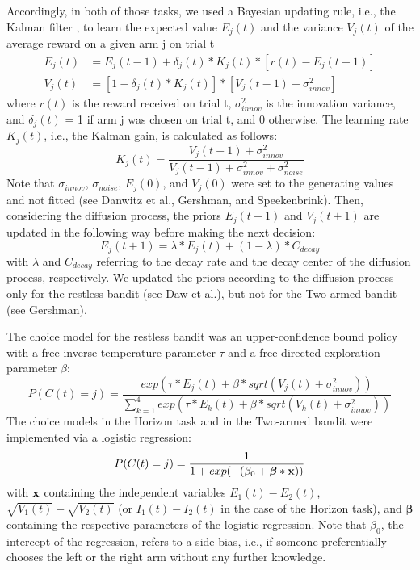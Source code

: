 \documentclass[fleqn,10pt]{wlscirep}
\begin{document}
Accordingly, in both of those tasks, we used a Bayesian updating rule, i.e., the Kalman filter \cite{kalman_new_1960, kalman_new_1961}, to learn the expected value $E_j(t)$ and the variance $V_j(t)$ of the average reward on a given arm j on trial t
\begin{align}
E_j(t)  &=  E_j(t-1)  + \delta_j(t) * K_j(t) * [r(t) - E_j(t-1)]\\
V_j(t) &= [1 - \delta_j(t) * K_j(t)] * [V_j(t-1) + \sigma_{innov}^2]
\end{align}
where $r(t)$ is the reward received on trial t, $\sigma_{innov}^2$ is the innovation variance, and $\delta_j(t)$ = 1 if arm j was chosen on trial t, and 0 otherwise. The learning rate $K_j(t)$, i.e., the Kalman gain, is calculated as follows:
\begin{equation}
K_j(t) = \frac{V_j(t-1) + \sigma_{innov}^2}{V_j(t-1) + \sigma_{innov}^2 + \sigma_{noise}^2}
\end{equation}
Note that $\sigma_{innov}$, $\sigma_{noise}$, $E_j(0)$, and $V_j(0)$ were set to the generating values and not fitted (see Danwitz et al.\cite{danwitz_parameter_2022}, Gershman\cite{gershman_deconstructing_2018}, and Speekenbrink\cite{speekenbrink_identifiability_2019}).
Then, considering the diffusion process, the priors $E_j(t+1)$ and $V_j(t+1)$  are updated in the following way before making the next decision:
\begin{equation}
    E_j(t+1) = \lambda * E_j(t) + (1 - \lambda)*C_{decay}
\end{equation}
with $\lambda$ and  $C_{decay}$ referring to the decay rate and the decay center of the diffusion process, respectively. We updated the priors according to the diffusion process only for the restless bandit (see Daw et al.\cite{daw_cortical_2006}), but not for the Two-armed bandit (see Gershman\cite{gershman_deconstructing_2018}).

The choice model for the restless bandit was an upper-confidence bound policy with a free inverse temperature parameter $\tau$ and a free directed exploration parameter $\beta$:
\begin{equation}
    P(C(t) = j) = \frac{exp(\tau * E_j(t) + \beta * sqrt(V_j(t) + \sigma_{innov}^2))}{\sum_{k = 1}^4 exp(\tau * E_k(t) + \beta * sqrt(V_k(t) + \sigma_{innov}^2))}
\end{equation}
The choice models in the Horizon task and in the Two-armed bandit were implemented via a logistic regression:
\begin{equation}
    P(C(t) = j) = \frac{1}{1 + exp(-(\beta_0 + \boldsymbol{\beta} * \bold{x}))}
\end{equation}
with $\bold{x}$ containing the independent variables $E_1(t) - E_2(t)$, $\sqrt{V_1(t)} - \sqrt{V_2(t)}$ (or $I_1(t) - I_2(t)$ in the case of the Horizon task), and $\boldsymbol{\beta}$ containing the respective parameters of the logistic regression. Note that $\beta_0$, the intercept of the regression, refers to a side bias, i.e., if someone preferentially chooses the left or the right arm without any further knowledge.
\end{document}
